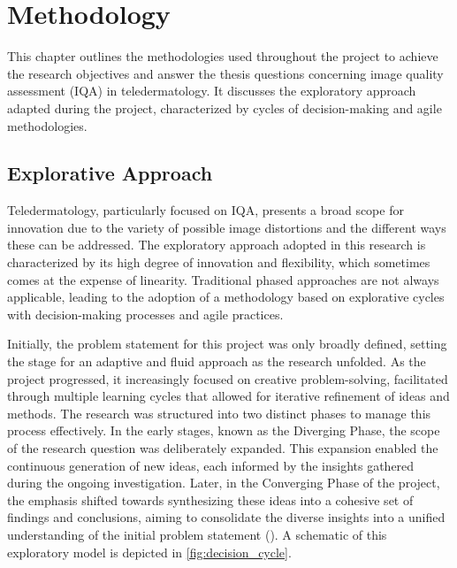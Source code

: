 \chapter{Methodology}
\label{ch:Methodology}
This chapter outlines the methodologies used throughout the project to achieve the research objectives and answer the thesis questions concerning image quality assessment (IQA) in teledermatology. It discusses the exploratory approach adapted during the project, characterized by cycles of decision-making and agile methodologies.\par

\section{Explorative Approach}
\label{sec:ExplorativeApproach}
Teledermatology, particularly focused on IQA, presents a broad scope for innovation due to the variety of possible image distortions and the different ways these can be addressed. The exploratory approach adopted in this research is characterized by its high degree of innovation and flexibility, which sometimes comes at the expense of linearity. Traditional phased approaches are not always applicable, leading to the adoption of a methodology based on explorative cycles with decision-making processes and agile practices. \par
\vspace{\baselineskip}
\noindent
Initially, the problem statement for this project was only broadly defined, setting the stage for an adaptive and fluid approach as the research unfolded. As the project progressed, it increasingly focused on creative problem-solving, facilitated through multiple learning cycles that allowed for iterative refinement of ideas and methods. The research was structured into two distinct phases to manage this process effectively. In the early stages, known as the Diverging Phase, the scope of the research question was deliberately expanded. This expansion enabled the continuous generation of new ideas, each informed by the insights gathered during the ongoing investigation. Later, in the Converging Phase of the project, the emphasis shifted towards synthesizing these ideas into a cohesive set of findings and conclusions, aiming to consolidate the diverse insights into a unified understanding of the initial problem statement (\cite{DesignThinking}). A schematic of this exploratory model is depicted in  \ref{fig:decision_cycle}.\par
